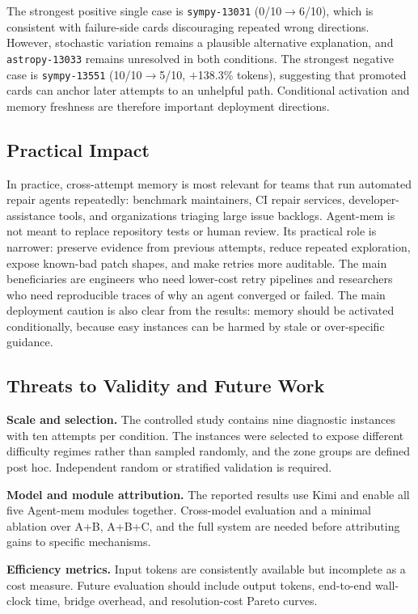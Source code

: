 \documentclass[runningheads]{llncs}
\begin{document}
The strongest positive single case is \texttt{sympy-13031} (0/10$\to$6/10), which is consistent with failure-side cards discouraging repeated wrong directions. However, stochastic variation remains a plausible alternative explanation, and \texttt{astropy-13033} remains unresolved in both conditions. The strongest negative case is \texttt{sympy-13551} (10/10$\to$5/10, $+$138.3\% tokens), suggesting that promoted cards can anchor later attempts to an unhelpful path. Conditional activation and memory freshness are therefore important deployment directions.

\subsection{Practical Impact}

In practice, cross-attempt memory is most relevant for teams that run automated repair agents repeatedly: benchmark maintainers, CI repair services, developer-assistance tools, and organizations triaging large issue backlogs. Agent-mem is not meant to replace repository tests or human review. Its practical role is narrower: preserve evidence from previous attempts, reduce repeated exploration, expose known-bad patch shapes, and make retries more auditable. The main beneficiaries are engineers who need lower-cost retry pipelines and researchers who need reproducible traces of why an agent converged or failed. The main deployment caution is also clear from the results: memory should be activated conditionally, because easy instances can be harmed by stale or over-specific guidance.

\subsection{Threats to Validity and Future Work}

\textbf{Scale and selection.} The controlled study contains nine diagnostic instances with ten attempts per condition. The instances were selected to expose different difficulty regimes rather than sampled randomly, and the zone groups are defined post hoc. Independent random or stratified validation is required.

\textbf{Model and module attribution.} The reported results use Kimi and enable all five Agent-mem modules together. Cross-model evaluation and a minimal ablation over A+B, A+B+C, and the full system are needed before attributing gains to specific mechanisms.

\textbf{Efficiency metrics.} Input tokens are consistently available but incomplete as a cost measure. Future evaluation should include output tokens, end-to-end wall-clock time, bridge overhead, and resolution-cost Pareto curves.
\end{document}
